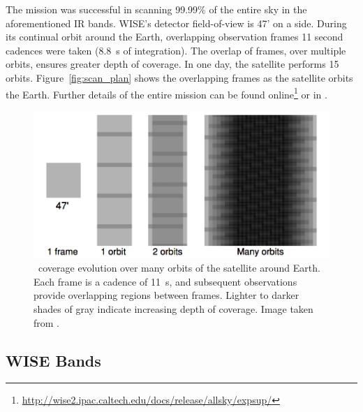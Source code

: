  
    The mission was successful in scanning 99.99\% of the entire sky in the aforementioned IR bands. WISE's detector field-of-view is 47' on a side. During its continual orbit around the Earth, overlapping observation frames 11 second cadences were taken (8.8~s of integration). The overlap of frames, over multiple orbits, ensures greater depth of coverage. In one day, the satellite performs 15 orbits. Figure~\ref{fig:scan_plan} shows the overlapping frames as the satellite orbits the Earth. Further details of the entire mission can be found online\footnote{\url{http://wise2.ipac.caltech.edu/docs/release/allsky/expsup/}} or in \citet{Wright2010}. 

    \begin{figure}
    \centering
    \includegraphics[width=\textwidth]{Ch2/wise_scan_plan}
    \caption[\WS\ Sky Coverage]{\WS\ coverage evolution over many orbits of the satellite around Earth. Each frame is a cadence of 11~s, and subsequent observations provide overlapping regions between frames. Lighter to darker shades of gray indicate increasing depth of coverage. Image taken from \citet{Wright2010}.}
    \label{fig:wise_scan_plan}
    \end{figure}
    
    
   
   
    \subsection{WISE Bands}\label{sec:wise_bands}

